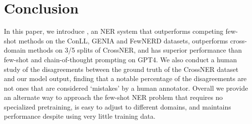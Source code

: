 \documentclass[11pt]{article}
\begin{document}
\section{Conclusion}
In this paper, we introduce \toolname, an NER system that outperforms competing few-shot methods on the ConLL, GENIA and FewNERD datasets, outperforms cross-domain methods on 3/5 splits of CrossNER, and has superior performance than few-shot and chain-of-thought prompting on GPT4. We also conduct a human study of the disagreements between the ground truth of the CrossNER dataset and our model output, finding that a notable percentage of the disagreements are not ones that are considered `mistakes' by a human annotator. Overall we provide an alternate way to approach the few-shot NER problem that requires no specialized pretraining, is easy to adjust to different domains, and maintains performance despite using very little training data.  



\newpage 

\newpage


\appendix
\end{document}
